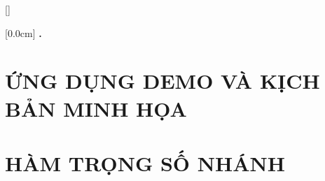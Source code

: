\documentclass[a4paper,13pt,3p,twoside]{report}
\renewcommand{\bibname}{Danh_sach_tai_lieu_tham_khao}
\theoremstyle{definition}
\begin{document}
\newpage
\renewcommand\bibname{TÀI LIỆU THAM KHẢO}
\printbibliography
{}

\appendixpage
\appendix
\addappheadtotoc

[]
\titlespacing*{\chapter}{0pt}{-20pt}{20pt}

    [0.0cm]             %
    {\bfseries\vspace{0.3cm}}                  %
    {{\bfseries{\scshape} \thecontentslabel.\ }} %
    {}         %
    {\contentspage}

\newpage
\chapter{ỨNG DỤNG DEMO VÀ KỊCH BẢN MINH HỌA}
\label{appendix:app_demo}


\newpage
\chapter{HÀM TRỌNG SỐ NHÁNH}
\label{appendix:branch_weight}

\end{document}
